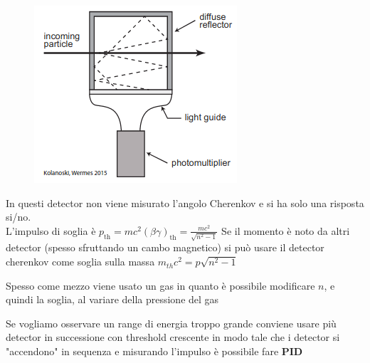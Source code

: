 


\begin{minipage}{0.4\textwidth}
    \begin{figure}[H]
        \centering
        \includegraphics[width=\textwidth,frame]{Chapters/images/Particle_identification/image-20220317181632663.png}

    \end{figure}
\end{minipage} \hspace{10pt}
\begin{minipage}{0.55\textwidth}

    In questi detector non viene misurato l'angolo Cherenkov e si ha solo una risposta si/no.\\ 
    L'impulso di soglia è $p_\text{th}=mc^2(\beta \gamma)_\text{th}=\frac{mc^2}{\sqrt{n^2-1}}$
Se il momento è noto da altri detector (spesso sfruttando un cambo magnetico) si  può usare il detector cherenkov come soglia sulla massa $m_{th}c^2=p\sqrt{n^2-1}$

\begin{details}
    
    Spesso come mezzo viene usato un gas in quanto è possibile modificare $n$, e quindi la soglia, al variare della pressione del gas

\end{details}
\end{minipage}
Se vogliamo osservare un range di energia troppo grande conviene usare più detector in successione con threshold crescente in modo tale che i detector si "accendono" in sequenza e misurando l'impulso è possibile fare \textbf{PID} 

